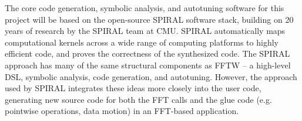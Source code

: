 The core code generation, symbolic analysis, and autotuning software for this project will be based on the open-source SPIRAL software stack,
building on 20 years of research by the SPIRAL team at CMU.
SPIRAL automatically maps computational kernels across a wide range of computing platforms to highly efficient code, and proves the correctness of the synthesized code.
The SPIRAL approach has many of the same structural components as FFTW -- a high-level DSL, symbolic analysis, code generation, and autotuning. However, the approach used by SPIRAL integrates these ideas more closely into the user code, generating new source code for both the FFT calls and the glue code (e.g. pointwise operations, data motion) in an FFT-based application.


